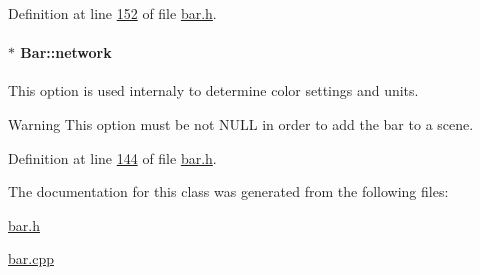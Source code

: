 Definition at line \hyperlink{bar_8h_source_l00152}{152} of file \hyperlink{bar_8h_source}{bar.\+h}.

\hypertarget{class_bar_a80025f13884750add58cc61b318357ff}{}
\paragraph[{network}]{$\ast$ Bar\+::network}\label{class_bar_a80025f13884750add58cc61b318357ff}
This option is used internaly to determine color settings and units. \begin{DoxyWarning}{Warning}
This option must be not N\+U\+L\+L in order to add the bar to a scene. 
\end{DoxyWarning}


Definition at line \hyperlink{bar_8h_source_l00144}{144} of file \hyperlink{bar_8h_source}{bar.\+h}.



The documentation for this class was generated from the following files\+:\begin{DoxyCompactItemize}
\item 
\hyperlink{bar_8h}{bar.\+h}\item 
\hyperlink{bar_8cpp}{bar.\+cpp}\end{DoxyCompactItemize}
